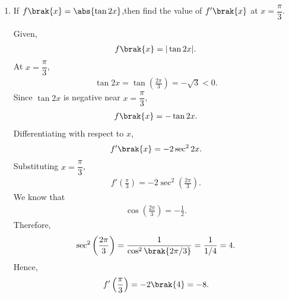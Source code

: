 \begin{enumerate}[label=\thesubsection.\arabic*, ref=\thesubsection.\theenumi]
From the domain condition,
\begin{align}
3\leq x^2\leq 5.
\end{align}
Subtracting $4$,
\begin{align}
-1\leq x^2-4\leq 1.
\end{align}
Thus, the expression $x^2-4$ takes every value
in the interval $[-1,1]$.

Since
\begin{align}
f\brak{x}=\sin^{-1}\brak{x^2-4},
\end{align}
and the principal range of $\sin^{-1}\brak{u}$ is
\begin{align}
-\frac{\pi}{2}\leq\sin^{-1}\brak{u}\leq\frac{\pi}{2},
\end{align}
the range of $f\brak{x}$ is
\begin{align}
\left[-\frac{\pi}{2},\frac{\pi}{2}\right].
\end{align}
Final Answer
\begin{align}
\text{Domain}
=[-\sqrt{5},-\sqrt{3}]
\cup[\sqrt{3},\sqrt{5}]
\end{align}
\begin{align}
\text{Range}
=\left[-\frac{\pi}{2},\frac{\pi}{2}\right]
\end{align}

\item
If $f\brak{x}=\abs{\tan 2x}$,then find the value of $f'\brak{x}$ at $x=\dfrac{\pi}{3}$.

\solution
Given,
\begin{align}
f\brak{x}=|\tan 2x|.
\end{align}
At $x=\dfrac{\pi}{3}$,
\begin{align}
\tan 2x=\tan\left(\frac{2\pi}{3}\right)
=-\sqrt{3}<0.
\end{align}
Since $\tan 2x$ is negative near $x=\dfrac{\pi}{3}$,
\begin{align}
f\brak{x}=-\tan 2x.
\end{align}
Differentiating with respect to $x$,
\begin{align}
f'\brak{x}=-2\sec^2 2x.
\end{align}
Substituting $x=\dfrac{\pi}{3}$,
\begin{align}
f'\left(\frac{\pi}{3}\right)
=-2\sec^2\left(\frac{2\pi}{3}\right).
\end{align}
We know that
\begin{align}
\cos\left(\frac{2\pi}{3}\right)=-\frac{1}{2}.
\end{align}
Therefore,
\begin{align}
\sec^2\left(\frac{2\pi}{3}\right)
=\frac{1}{\cos^2\brak{2\pi/3}}
=\frac{1}{1/4}=4.
\end{align}
Hence,
\begin{align}
f'\left(\frac{\pi}{3}\right)=-2\brak{4}=-8.
\end{align}


\end{enumerate}
